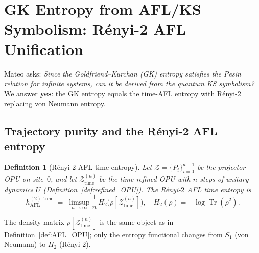\documentclass[12pt,a4paper]{article}
\newtheorem{definition}[theorem]{Definition}
\DeclareMathOperator{\Tr}{Tr}
\begin{document}
\section{GK Entropy from AFL/KS Symbolism: R\'enyi-2 AFL Unification}
\label{sec:gk_afl_unification}

Mateo asks: \emph{Since the Goldfriend--Kurchan (GK) entropy satisfies the Pesin
relation for infinite systems, can it be derived from the quantum KS symbolism?}
We answer \textbf{yes}: the GK entropy equals the time-AFL entropy with Rényi-2
replacing von Neumann entropy.

\subsection{Trajectory purity and the R\'enyi-2 AFL entropy}

\begin{definition}[R\'enyi-2 AFL time entropy]
  \label{def:renyi2_afl}
  Let $\mathcal{Z}=\{P_i\}_{i=0}^{d-1}$ be the projector OPU on site~$0$, and let
  $\mathcal{Z}_{\mathrm{time}}^{(n)}$ be the time-refined OPU with $n$ steps of
  unitary dynamics $U$ (Definition~\ref{def:refined_OPU}).  The
  \emph{R\'enyi-$2$ AFL time entropy} is
  \[
    h_{\mathrm{AFL}}^{(2),\mathrm{time}}
    \;=\; \limsup_{n\to\infty}\frac{1}{n}\,H_2\!\bigl(\rho[\mathcal{Z}^{(n)}_{\mathrm{time}}]\bigr),
    \quad
    H_2(\rho) = -\log\Tr(\rho^2).
  \]
\end{definition}

The density matrix $\rho[\mathcal{Z}^{(n)}_{\mathrm{time}}]$ is the same object as
in Definition~\ref{def:AFL_OPU}; only the entropy functional changes from $S_1$
(von Neumann) to $H_2$ (R\'enyi-$2$).
\end{document}
